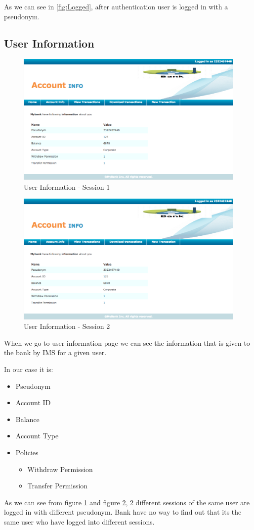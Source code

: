 As we can see in \ref{fig:Logged}, after authentication user is logged in with a pseudonym.	
\subsection{User Information}
\begin{figure}[h]
	\centering
	\includegraphics[width=\textwidth]{figures/Account1}
	\caption{User Information - Session 1}
	\label{fig:Account1}
\end{figure}	
\begin{figure}[h]
	\centering
	\includegraphics[width=\textwidth]{figures/Account1}
	\caption{User Information - Session 2}
	\label{fig:Account2}
\end{figure}
When we go to user information page we can see the information that is given to the bank by IMS for a given user.

In our case it is:
\begin{itemize}
	\item Pseudonym
	\item Account ID
	\item Balance
	\item Account Type
	\item Policies
	\begin{itemize}
		\item Withdraw Permission
		\item Transfer Permission
	\end{itemize}
\end{itemize}
As we can see from figure \ref{fig:Account1} and figure \ref{fig:Account2}, 2 different sessions of the same user are logged in with different pseudonym. Bank have no way to find out that its the same user who have logged into different sessions.

